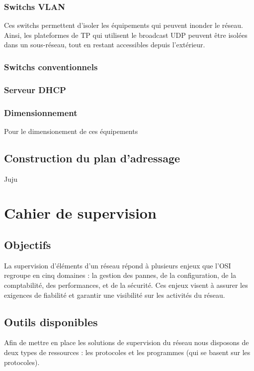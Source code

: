 \documentclass[a4paper]{article}
\begin{document}
	\subsubsection{Switchs VLAN}
Ces switchs permettent d'isoler les équipements qui peuvent inonder le réseau. Ainsi, les plateformes de TP qui utilisent le broadcast UDP peuvent être isolées dans un sous-réseau, tout en restant accessibles depuis l'extérieur.
	
	\subsubsection{Switchs conventionnels}
	
	\subsubsection{Serveur DHCP}

	\subsubsection{Dimensionnement}
Pour le dimensionement de ces équipements %
	
	\subsection{Construction du plan d'adressage}
	Juju
	
\section{Cahier de supervision}

\subsection{Objectifs}
La supervision d'éléments d'un réseau répond à plusieurs enjeux que l'OSI regroupe en cinq domaines : la gestion des pannes, de la configuration, de la comptabilité, des performances, et de la sécurité. Ces enjeux visent à assurer les exigences de fiabilité et garantir une visibilité sur les activités du réseau.  

\subsection{Outils disponibles}

Afin de mettre en place les solutions de supervision du réseau nous disposons de deux types de ressources : les protocoles et les programmes (qui se basent sur les protocoles).\\ 
\end{document}
